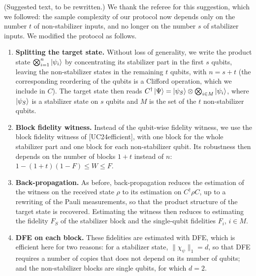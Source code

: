\documentclass[a4paper,11pt]{article}
\newenvironment{Response}
{\noindent \color{RawSienna}{\bf Response:} }
{\medskip}
\begin{document}
\begin{Response}
(Suggested text, to be rewritten.)
We thank the referee for this suggestion, which we followed: the sample complexity of our protocol now depends only on the number $t$ of non-stabilizer inputs, and no longer on the number $s$ of stabilizer inputs. We modified the protocol as follows.

\begin{enumerate}
    \item \textbf{Splitting the target state.} Without loss of generality, we write the product state $\bigotimes_{i=1}^n\ket{\psi_i}$ by concentrating its stabilizer part in the first $s$ qubits, leaving the non-stabilizer states in the remaining $t$ qubits, with $n=s+t$ (the corresponding reordering of the qubits is a Clifford operation, which we include in $C$). The target state then reads $C^\dagger\ket\Psi=\ket{\psi_S}\otimes\bigotimes_{i\in M}\ket{\psi_i}$, where $\ket{\psi_S}$ is a stabilizer state on $s$ qubits and $M$ is the set of the $t$ non-stabilizer qubits.

    \item \textbf{Block fidelity witness.} Instead of the qubit-wise fidelity witness, we use the block fidelity witness of [UC24efficient], with one block for the whole stabilizer part and one block for each non-stabilizer qubit. Its robustness then depends on the number of blocks $1+t$ instead of $n$: $1-(1+t)(1-F)\le W\le F$.

    \item \textbf{Back-propagation.} As before, back-propagation reduces the estimation of the witness on the received state $\rho$ to its estimation on $C^\dagger\rho C$, up to a rewriting of the Pauli measurements, so that the product structure of the target state is recovered. Estimating the witness then reduces to estimating the fidelity $F_S$ of the stabilizer block and the single-qubit fidelities $F_i$, $i\in M$.

    \item \textbf{DFE on each block.} These fidelities are estimated with DFE, which is efficient here for two reasons: for a stabilizer state, $\|\chi_\psi\|_1=d$, so that DFE requires a number of copies that does not depend on its number of qubits; and the non-stabilizer blocks are single qubits, for which $d=2$.


\end{enumerate}
\end{Response}
\end{document}
